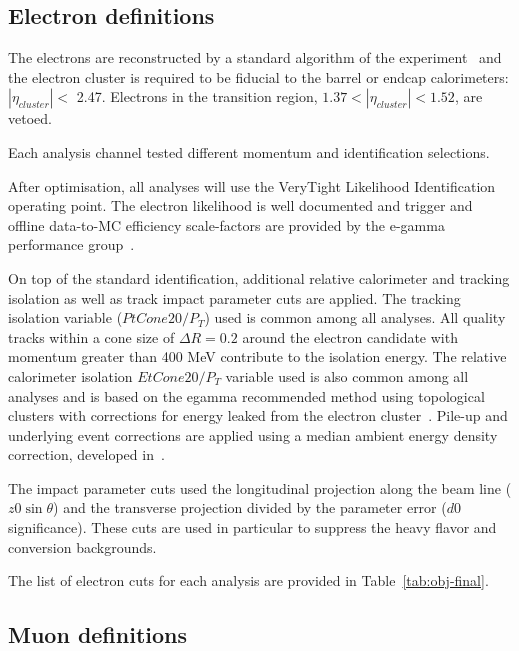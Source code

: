
\subsection{Electron definitions}
\label{subsec:electrondescription}

The electrons are reconstructed by a standard algorithm of the
experiment~\cite{EgammaSF} and the electron cluster is required to be fiducial 
to the barrel or endcap calorimeters: $|\eta_{cluster}| < $ 2.47. Electrons
in the transition region, $1.37 < |\eta_{cluster}| < 1.52$, are vetoed. 

Each analysis channel tested different momentum and identification selections.

After optimisation, all analyses will use the VeryTight Likelihood Identification operating
point. The electron likelihood is well documented and trigger and offline data-to-MC
efficiency scale-factors are provided by the e-gamma performance
group~\cite{EgammaSF}. 

On top of the standard identification, additional relative calorimeter and
tracking isolation as well as track impact parameter cuts  are applied. The tracking
isolation variable ($PtCone20/P_T$) used is common among all analyses. All
quality tracks within a cone size of $\Delta R=0.2$ around the electron
candidate with momentum greater than 400 MeV contribute to the isolation
energy.  The relative calorimeter isolation $EtCone20/P_T$ variable used is
also common among all analyses and is based on the e\-gamma recommended method
using topological clusters with corrections for energy leaked from the
electron cluster~\cite{Topo}. Pile-up and underlying event corrections are applied using
a median ambient energy density correction, developed in~\cite{PileupCorrections}. 

The impact parameter cuts used the longitudinal projection along 
the beam line ($z0\sin{\theta}$) and the transverse projection divided by the
parameter error ($d0$ significance). These cuts are used in particular to suppress
the heavy flavor and conversion backgrounds. 

The list of electron cuts for each analysis are provided in Table~\ref{tab:obj-final}. 


\subsection{Muon definitions}
\label{subsec:muondescription}

